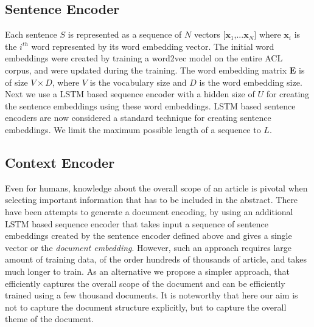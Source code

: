 \subsection{Sentence Encoder} 
Each sentence $S$ is represented as a sequence of $N$ vectors $[\boldsymbol{x}_1$,...$\boldsymbol{x}_N]$ where $\boldsymbol{x}_i$ is the $i^{th}$ word represented by its word embedding vector. The initial word embeddings were created by training a word2vec\cite{mikolov2013efficient} model on the entire ACL corpus, and were updated during the training. The word embedding matrix $\boldsymbol{E}$ is of size $V\times D$, where $V$ is the vocabulary size and $D$ is the word embedding size.
Next we use a LSTM based sequence encoder with a hidden size of $U$ for creating the sentence embeddings using these word embeddings. LSTM based sentence encoders are now considered a standard technique for creating sentence embeddings. We limit the maximum possible length of a sequence to $L$.

\subsection{Context Encoder} Even for humans, knowledge about the overall scope of an article is pivotal when selecting important information that has to be included in the abstract. There have been attempts to generate a document encoding, by using an additional LSTM based sequence encoder that takes input a sequence of sentence embeddings created by the sentence encoder defined above\cite{cheng2016neural} and gives a single vector or the \emph{document embedding}. However, such an approach requires large amount of training data, of the order hundreds of thousands of article, and takes much longer to train. As an alternative we propose a simpler approach, that efficiently captures the overall scope of the document and can be efficiently trained using a few thousand documents. It is noteworthy that here our aim is not to capture the document structure explicitly, but to capture the overall theme of the document.


